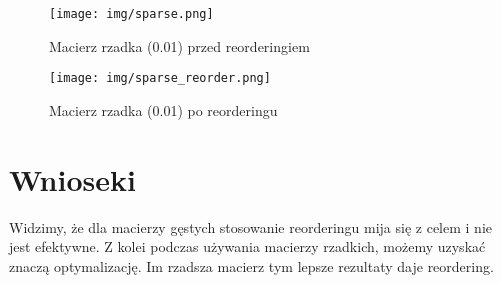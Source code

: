 \documentclass{article}
\begin{document}
\begin{figure}[H]
    \captionsetup{justification=centering}
    \centering
  \texttt{[image: img/sparse.png]}
  \caption{Macierz rzadka (0.01) przed reorderingiem}
\end{figure}

\begin{figure}[H]
    \captionsetup{justification=centering}
    \centering
  \texttt{[image: img/sparse\_reorder.png]}
  \caption{Macierz rzadka (0.01) po reorderingu}
\end{figure}


\section{Wnioseki}
Widzimy, że dla macierzy gęstych stosowanie reorderingu mija się z celem i nie jest efektywne.
Z kolei podczas używania macierzy rzadkich, możemy uzyskać znaczą optymalizację.
Im rzadsza macierz tym lepsze rezultaty daje reordering.
\end{document}
